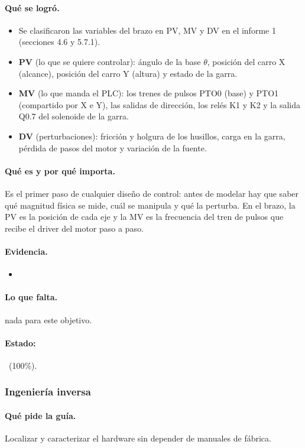 \documentclass[a4paper,11pt]{article}
\begin{document}
\paragraph{Qué se logró.}
\begin{itemize}
\item Se clasificaron las variables del brazo en PV, MV y DV en el informe 1 (secciones 4.6 y 5.7.1).
\item \textbf{PV} (lo que se quiere controlar): ángulo de la base $\theta$, posición del carro X (alcance), posición del carro Y (altura) y estado de la garra.
\item \textbf{MV} (lo que manda el PLC): los trenes de pulsos PTO0 (base) y PTO1 (compartido por X e Y), las salidas de dirección, los relés K1 y K2 y la salida Q0.7 del solenoide de la garra.
\item \textbf{DV} (perturbaciones): fricción y holgura de los husillos, carga en la garra, pérdida de pasos del motor y variación de la fuente.
\end{itemize}
\paragraph{Qué es y por qué importa.} Es el primer paso de cualquier diseño de control: antes de modelar hay que saber qué magnitud física se mide, cuál se manipula y qué la perturba. En el brazo, la PV es la posición de cada eje y la MV es la frecuencia del tren de pulsos que recibe el driver del motor paso a paso.
\paragraph{Evidencia.}
\begin{itemize}\small
\item {}
\end{itemize}
\paragraph{Lo que falta.} nada para este objetivo.
\paragraph{Estado:} \cumple~(100\%).
\subsubsection{Ingeniería inversa}
\paragraph{Qué pide la guía.} Localizar y caracterizar el hardware sin depender de manuales de fábrica.
\end{document}
